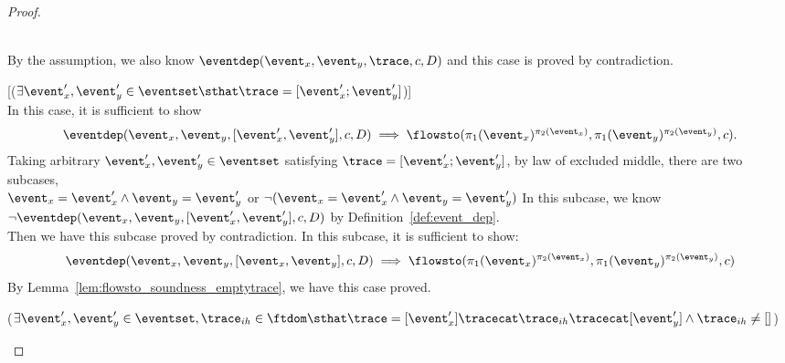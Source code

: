 \begin{proof}
\begin{case}
    \\
    By the assumption, we also know $\eventdep(\event_x, \event_y, \trace, c, D)$ and this case is proved by contradiction.
    \end{case}
    \begin{case}
      \label{case:soundness_basecase}
      [($\exists  \event_x', \event_y' \in \eventset \sthat \trace = [\event_x'; \event_y']$)]
      \\
      In this case, it is sufficient to show
      \[
      \begin{array}{l}
          \eventdep(\event_x, \event_y, [\event_x', \event_y'], c, D)
         \implies \flowsto(\pi_1(\event_x)^{\pi_2(\event_x)}, \pi_1(\event_y)^{\pi_2(\event_y)}, c).
      \end{array}
      \]
      Taking arbitrary $ \event_x', \event_y' \in \eventset $  satisfying $\trace = [\event_x'; \event_y']$, 
      by law of excluded middle, there are two subcases,
      \\
      $\event_x = \event_x' \land  \event_y = \event_y'$ or
      $\neg(\event_x = \event_x' \land  \event_y = \event_y')$
      In this subcase,
      we know $\neg \eventdep(\event_x, \event_y, [\event_x', \event_y'], c, D)$
      by Definition~\ref{def:event_dep}.
      \\
      Then we have this subcase proved by contradiction.
      In this subcase,  it is sufficient to show: 
      \[
        \eventdep(\event_x, \event_y, [\event_x, \event_y], c, D) 
        \implies \flowsto(\pi_1(\event_x)^{\pi_2(\event_x)}, \pi_1(\event_y)^{\pi_2(\event_y)}, c)
      \]
     By Lemma~\ref{lem:flowsto_soundness_emptytrace}, we have this case proved.
      \end{case}
        \begin{case}
        ($\exists \event_x', \event_y' \in \eventset, \trace_{ih} \in \ftdom \sthat \trace = [\event_x'] \tracecat \trace_{ih} \tracecat [\event_y'] \land \trace_{ih} \neq {[]}$)

\end{case}
\end{proof}
